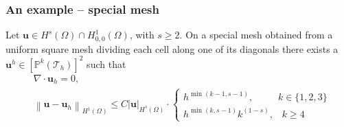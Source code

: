 \documentclass{beamer}
\let\vec\mathbf
\newcommand{\norm}[1]{\left\lVert#1\right\rVert}
\newcommand{\abs}[1]{\left|#1\right|}
\begin{document}
	\begin{frame}
		\frametitle{An example -- special mesh}
		\begin{lemma}
			Let $\vec{u} \in H^s(\Omega)\cap H^{1}_{0,0}(\Omega)$, with $s\geq 2$. On a special mesh obtained from a uniform square mesh dividing each cell along one of its diagonals there exists a $\vec{u}^h \in [\mathbb{P}^k(\mathcal{T}_h) ]^2$ such that
			\begin{align*}
				&\nabla\cdot \vec{u}_h = 0, \\
				&\norm{\vec{u}-\vec{u}_h}_{H^1(\Omega)} \leq C\abs{\vec{u}}_{H^s(\Omega)}\cdot \begin{cases}
					h^{\min(k-1,s-1)},\;\;\qquad k\in \{1,2,3\}\\
					h^{\min(k,s-1)}k^{(1-s)},\;\;\; k \geq 4
				\end{cases}
			\end{align*}
		\end{lemma}
	\end{frame}
\end{document}
